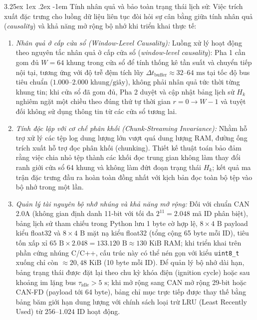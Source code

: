 \documentclass[12pt, a4paper, reqno, oneside]{book}
\makeatletter
\renewcommand\paragraph{\@startsection{paragraph}{5}{\z@}%
  {3.25ex \@plus1ex \@minus.2ex}%
  {-1em}%
  {\normalfont\normalsize\bfseries}}
\DeclareRobustCommand{\code}[1]{\nolinkurl{#1}}
\makeatother
\begin{document}
\paragraph{Tính nhân quả và bảo toàn trạng thái lịch sử:}
Việc trích xuất đặc trưng cho luồng dữ liệu liên tục đòi hỏi sự cân bằng giữa tính nhân quả (\textit{causality}) và khả năng mở rộng bộ nhớ khi triển khai thực tế:
\begin{enumerate}
    \item \textit{Nhân quả ở cấp cửa sổ (Window-Level Causality):} Luồng xử lý hoạt động theo nguyên tắc nhân quả ở cấp cửa sổ (\textit{window-level causality}): Pha 1 cần gom đủ $W=64$ khung trong cửa sổ để tính thống kê tần suất và chuyển tiếp nội tại, tương ứng với độ trễ đệm tích lũy $\Delta t_{\text{buffer}} \approx 32\text{--}64\text{ ms}$ tại tốc độ bus tiêu chuẩn ($1.000\text{--}2.000\text{ khung/giây}$), không phải nhân quả tức thời từng khung tin; khi cửa sổ đã gom đủ, Pha 2 duyệt và cập nhật bảng lịch sử $H_k$ nghiêm ngặt một chiều theo đúng thứ tự thời gian $r=0 \to W-1$ và tuyệt đối không sử dụng thông tin từ các cửa sổ tương lai.
    \item \textit{Tính độc lập với cơ chế phân khối (Chunk-Streaming Invariance):} Nhằm hỗ trợ xử lý các tệp log dung lượng lớn vượt quá dung lượng RAM, đường ống trích xuất hỗ trợ đọc phân khối (chunking). Thiết kế thuật toán bảo đảm rằng việc chia nhỏ tệp thành các khối đọc trung gian không làm thay đổi ranh giới cửa sổ 64 khung và không làm đứt đoạn trạng thái $H_k$; kết quả ma trận đặc trưng đầu ra hoàn toàn đồng nhất với kịch bản đọc toàn bộ tệp vào bộ nhớ trong một lần.
    \item \textit{Quản lý tài nguyên bộ nhớ nhúng và khả năng mở rộng:} Đối với chuẩn CAN 2.0A (không gian định danh 11-bit với tối đa $2^{11} = 2.048$ mã ID phân biệt), bảng lịch sử tham chiếu trong Python lưu 1 byte cờ hợp lệ, $8 \times 4\text{ B}$ payload kiểu float32 và $8 \times 4\text{ B}$ mặt nạ kiểu float32 (tổng cộng 65 byte mỗi ID), tiêu tốn xấp xỉ $65\text{ B} \times 2.048 = 133.120\text{ B} \approx 130\text{ KiB}$ RAM; khi triển khai trên phần cứng nhúng C/C++, cấu trúc này có thể nén gọn với kiểu \code{uint8_t} xuống chỉ còn $\approx 20{,}48\text{ KiB}$ (10 byte mỗi ID). Để quản lý bộ nhớ dài hạn, bảng trạng thái được đặt lại theo chu kỳ khóa điện (ignition cycle) hoặc sau khoảng im lặng bus $\tau_{\text{idle}} > 5\text{ s}$; khi mở rộng sang CAN mở rộng 29-bit hoặc CAN-FD (payload tới 64 byte), bảng chỉ mục trực tiếp được thay thế bằng bảng băm giới hạn dung lượng với chính sách loại trừ LRU (Least Recently Used) từ $256\text{--}1.024$ ID hoạt động.
\end{enumerate}
\end{document}
